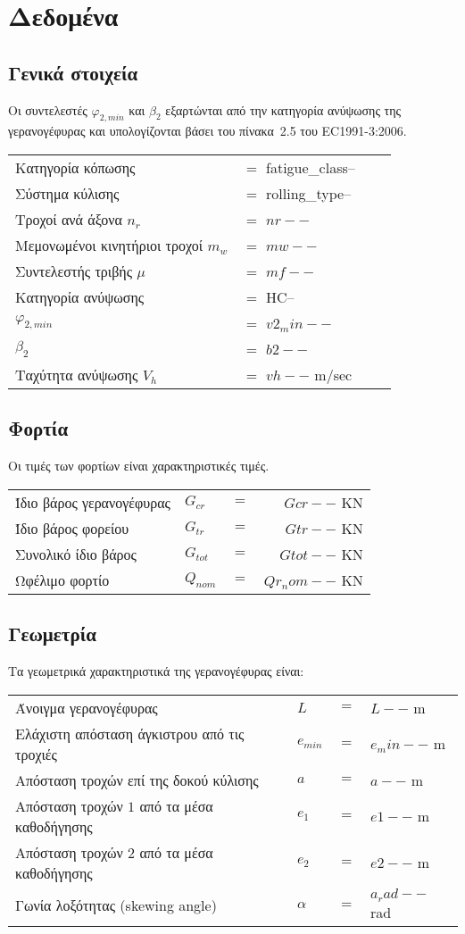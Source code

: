 \section{Δεδομένα}
\subsection{Γενικά στοιχεία}
Οι συντελεστές $φ_{2,min}$ και $β_2$ εξαρτώνται από την κατηγορία ανύψωσης της γερανογέφυρας και υπολογίζονται βάσει του πίνακα~2.5 του EC1991-3:2006.

\begin{tabular}{llcr}
Κατηγορία κόπωσης					&$=$ fatigue_class-- \\ 
Σύστημα κύλισης						&$=$ rolling_type-- \\ 
Τροχοί ανά άξονα	$n_r$			&$=$ $nr--$ \\ 
Μεμονωμένοι κινητήριοι τροχοί $m_w$ &$=$ $mw--$ \\
Συντελεστής τριβής $\mu$			&$=$ $mf--$ \\ 
Κατηγορία ανύψωσης					&$=$ HC-- \\
$φ_{2,min}$							&$=$ $v2_min--$ \\ 
$β_2$								&$=$ $b2--$ \\
Ταχύτητα ανύψωσης  $V_h$			&$=$ $vh--$ m/sec
\end{tabular}

\subsection{Φορτία}
Οι τιμές των φορτίων είναι χαρακτηριστικές τιμές.

\begin{tabular}{llcr}
Ίδιο βάρος γερανογέφυρας     & $G_{cr}$  &$=$ &$Gcr--$ KN \\ 
Ίδιο βάρος φορείου           & $G_{tr}$  &$=$ &$Gtr--$ KN \\ 
Συνολικό ίδιο βάρος          & $G_{tot}$ &$=$ &$Gtot--$ KN \\ 
Ωφέλιμο φορτίο               & $Q_{nom}$ &$=$ &$Qr_nom--$ KN 
\end{tabular}

\subsection{Γεωμετρία}
Τα γεωμετρικά χαρακτηριστικά της γερανογέφυρας είναι:

\begin{tabular}{llcl}
Άνοιγμα γερανογέφυρας                                 &$L$		  &$=$ &$L--$ m \\ 
Ελάχιστη απόσταση άγκιστρου από τις τροχιές   		  &$e_{min}$  &$=$ &$e_min--$ m \\ 
Απόσταση τροχών επί της δοκού κύλισης                 &$a$		  &$=$ &$a--$ m \\ 
Απόσταση τροχών $1$ από τα μέσα καθοδήγησης           &$e_1$      &$=$ &$e1--$ m \\ 
Απόσταση τροχών $2$ από τα μέσα καθοδήγησης           &$e_2$      &$=$ &$e2--$ m \\
Γωνία λοξότητας (skewing angle)						  &$α$		  &$=$ &$a_rad--$ rad
\end{tabular}

